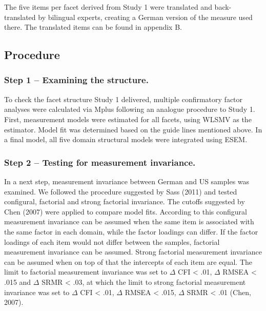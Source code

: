 \documentclass[,man]{apa6}
\theoremstyle{definition}
\theoremstyle{definition}
\theoremstyle{definition}
\theoremstyle{remark}
\begin{document}
The five items per facet derived from Study 1 were translated and
back-translated by bilingual experts, creating a German version of the
measure used there. The translated items can be found in appendix B.

\hypertarget{procedure-1}{%
\subsection{Procedure}\label{procedure-1}}

\hypertarget{step-1-examining-the-structure.}{%
\subsubsection{Step 1 -- Examining the
structure.}\label{step-1-examining-the-structure.}}

To check the facet structure Study 1 delivered, multiple confirmatory
factor analyses were calculated via Mplus following an analogue
procedure to Study 1. First, measurement models were estimated for all
facets, using WLSMV as the estimator. Model fit was determined based on
the guide lines mentioned above. In a final model, all five domain
structural models were integrated using ESEM.

\hypertarget{step-2-testing-for-measurement-invariance.}{%
\subsubsection{Step 2 -- Testing for measurement
invariance.}\label{step-2-testing-for-measurement-invariance.}}

In a next step, measurement invariance between German and US samples was
examined. We followed the procedure suggested by Sass (2011) and tested
configural, factorial and strong factorial invariance. The cutoffs
suggested by Chen (2007) were applied to compare model fits. According
to this configural measurement invariance can be assumed when the same
item is associated with the same factor in each domain, while the factor
loadings can differ. If the factor loadings of each item would not
differ between the samples, factorial measurement invariance can be
assumed. Strong factorial measurement invariance can be assumed when on
top of that the intercepts of each item are equal. The limit to
factorial measurement invariance was set to \(\Delta\) CFI \textless{}
.01, \(\Delta\) RMSEA \textless{} .015 and \(\Delta\) SRMR \textless{}
.03, at which the limit to strong factorial measurement invariance was
set to \(\Delta\) CFI \textless{} .01, \(\Delta\) RMSEA \textless{}
.015, \(\Delta\) SRMR \textless{} .01 (Chen, 2007).
\end{document}
